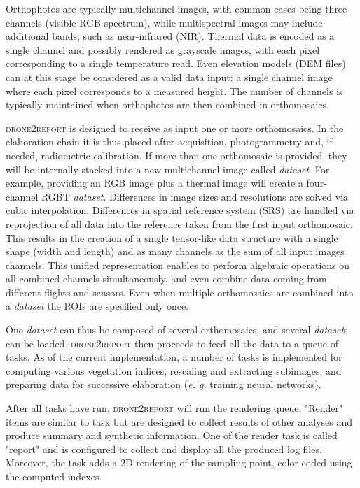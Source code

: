 \documentclass[drones,technicalnote,accept,pdftex,moreauthors]{Definitions/mdpi}
\begin{document}
Orthophotos are typically multichannel images, with common cases being three channels (visible RGB spectrum), while multispectral images may include additional bands, such as near-infrared (NIR). Thermal data is encoded as a single channel and possibly rendered as grayscale images, with each pixel corresponding to a single temperature read. Even elevation models (DEM files) can at this stage be considered as a valid data input: a single channel image where each pixel corresponds to a measured height. The number of channels is typically maintained when orthophotos are then combined in orthomosaics.

\textsc{drone2report} is designed to receive as input one or more orthomosaics. In the elaboration chain it is thus placed after 
acquisition, photogrammetry and, if needed, radiometric calibration. If more than one orthomosaic is provided, they will be internally stacked into a new multichannel image called \textit{dataset}. For example, providing an RGB image plus a thermal image will create a four-channel RGBT \textit{dataset}. Differences in image sizes and resolutions are solved via cubic interpolation. Differences in spatial reference system (SRS) are handled via
reprojection of all data into the reference taken from the first input orthomosaic.
This results in the creation of a single tensor-like data structure with a single shape (width and length) and as many channels as the sum of all input images channels. This unified representation enables to perform algebraic operations on all combined channels simultaneously, and even combine data coming from different flights and sensors. Even when multiple orthomosaics are combined into a \textit{dataset} the ROIs are specified only once.

One \textit{dataset} can thus be composed of several orthomosaics, and several \textit{dataset}s can be loaded. \textsc{drone2report} then proceeds to feed all the data to a queue of tasks. As of the current implementation, a number of tasks is implemented for computing various vegetation indices, rescaling and extracting subimages, and preparing data for successive elaboration (\textit{e. g.} training neural networks). 

After all tasks have run, \textsc{drone2report} will run the rendering queue. "Render" items are similar to task but are designed to collect results of other analyses and produce summary and synthetic information. One of the render task is called "report" and is configured to collect and display all the produced log files. Moreover, the task adds a 2D rendering of the sampling point, color coded using the computed indexes.
\end{document}
